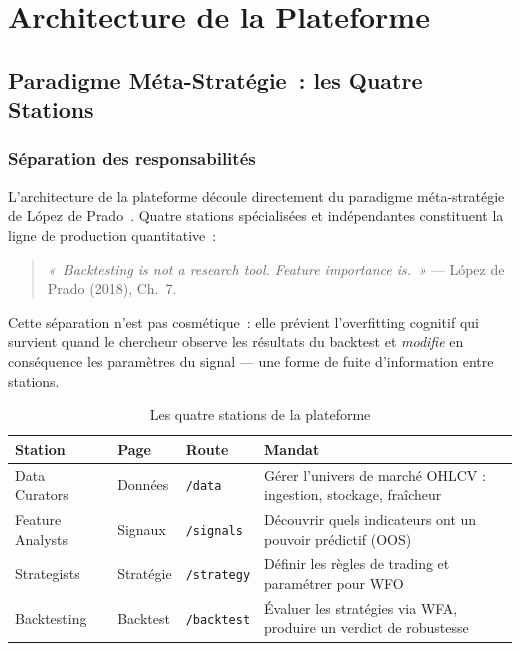 \chapter{Architecture de la Plateforme}
\label{ch:architecture}

\section{Paradigme Méta-Stratégie~: les Quatre Stations}
\label{sec:quatre_stations}

\subsection{Séparation des responsabilités}

L'architecture de la plateforme découle directement du paradigme méta-stratégie de
López de Prado~\cite{lopezdeprado2018}. Quatre stations spécialisées et indépendantes
constituent la ligne de production quantitative~:

\begin{quote}
\textit{«~Backtesting is not a research tool. Feature importance is.~»}
— López de Prado (2018), Ch.~7.
\end{quote}

Cette séparation n'est pas cosmétique~: elle prévient l'overfitting cognitif qui
survient quand le chercheur observe les résultats du backtest et \emph{modifie} en
conséquence les paramètres du signal — une forme de fuite d'information entre stations.

\begin{table}[H]
\centering
\caption{Les quatre stations de la plateforme}
\label{tab:quatre_stations}
\begin{tabularx}{\linewidth}{@{}lllY@{}}
\toprule
\textbf{Station} & \textbf{Page}    & \textbf{Route}     & \textbf{Mandat} \\
\midrule
Data Curators    & Données          & \texttt{/data}     & Gérer l'univers de marché OHLCV : ingestion, stockage, fraîcheur \\
Feature Analysts & Signaux          & \texttt{/signals}  & Découvrir quels indicateurs ont un pouvoir prédictif (OOS) \\
Strategists      & Stratégie        & \texttt{/strategy} & Définir les règles de trading et paramétrer pour WFO \\
Backtesting      & Backtest         & \texttt{/backtest} & Évaluer les stratégies via WFA, produire un verdict de robustesse \\
\bottomrule
\end{tabularx}
\end{table}

